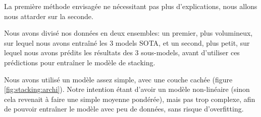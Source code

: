 \documentclass[11pt,a4paper, french]{article}
\begin{document}
La première méthode envisagée ne nécessitant pas plus d'explications, nous allons nous attarder sur la seconde.

Nous avons divisé nos données en deux ensembles: un premier, plus volumineux, sur lequel nous avons entraîné les 3 models SOTA, et un second, plus petit, sur lequel nous avons prédits les résultats des 3 sous-models, avant d'utiliser ces prédictions pour entraîner le modèle de stacking.

Nous avons utilisé un modèle assez simple, avec une couche cachée (figure \ref{fig:stacking:archi}). Notre intention étant d'avoir un modèle non-linéaire (sinon cela revenait à faire une simple moyenne pondérée), mais pas trop complexe, afin de pouvoir entraîner le modèle avec peu de données, sans risque d'overfitting.

\begin{figure}
\begin{center}
\end{center}
\end{figure}
\end{document}
